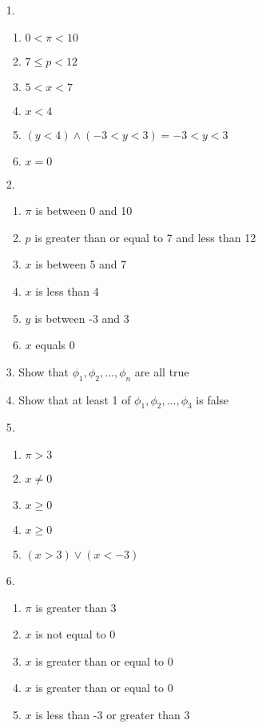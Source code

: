 \documentclass[11pt]{exam}
\author{@dantevangelista}
\begin{document}

\begin{enumerate}[leftmargin=0pt]

\item[1.]
\begin{enumerate}[label=(\alph*)]
    \item $0 < \pi < 10$
    \item $7 \leq p < 12$
    \item $5 < x < 7$
    \item $x < 4$
    \item $(y < 4) \land (-3 < y < 3) = -3 < y < 3$
    \item $x = 0$
\end{enumerate}

\item[2.]
\begin{enumerate}[label=(\alph*)]
    \item $\pi$ is between 0 and 10
    \item $p$ is greater than or equal to 7 and less than 12
    \item $x$ is between 5 and 7
    \item $x$ is less than 4
    \item $y$ is between -3 and 3
    \item $x$ equals 0
\end{enumerate}

\item[3.] Show that $\phi_1, \phi_2, ..., \phi_n$ are all true

\item[4.] Show that at least 1 of $\phi_1, \phi_2, ..., \phi_3$ is false

\item[5.] 
\begin{enumerate}[label=(\alph*)]
    \item $\pi > 3$
    \item $x \neq 0$
    \item $x \geq 0$
    \item $x \geq 0$
    \item $(x > 3) \lor (x < -3)$
\end{enumerate}

\item[6.]
\begin{enumerate}[label=(\alph*)]
    \item $\pi$ is greater than 3
    \item $x$ is not equal to 0
    \item $x$ is greater than or equal to 0
    \item $x$ is greater than or equal to 0
    \item $x$ is less than -3 or greater than 3
\end{enumerate}


\end{enumerate}
\end{document}
